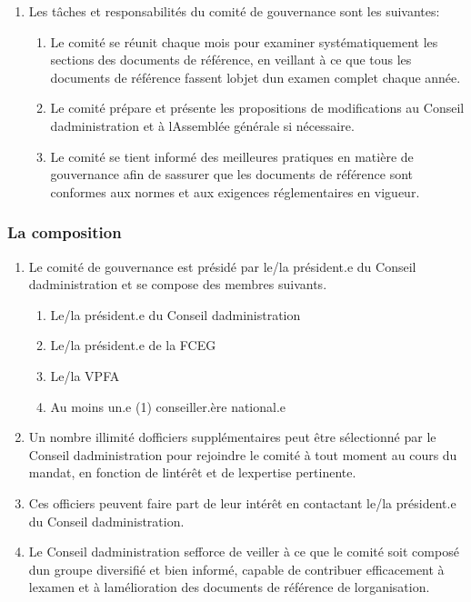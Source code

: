 \begin{enumerate}
 \item
  Les tâches et responsabilités du comité de gouvernance sont les suivantes:

  \begin{enumerate}
   \item
    Le comité se réunit chaque mois pour examiner systématiquement les sections des documents de référence, en veillant à ce que tous les documents de référence fassent l\textquotesingle objet d\textquotesingle un examen complet chaque année.
   \item
    Le comité prépare et présente les propositions de modifications au Conseil d\textquotesingle administration et à l\textquotesingle Assemblée générale si nécessaire.
   \item
    Le comité se tient informé des meilleures pratiques en matière de gouvernance afin de s\textquotesingle assurer que les documents de référence sont conformes aux normes et aux exigences réglementaires en vigueur.
  \end{enumerate}
\end{enumerate}

\subsubsection{La composition}
\label{la-composition}

\begin{enumerate}
 \item
  Le comité de gouvernance est présidé par le/la président.e du Conseil d\textquotesingle administration et se compose des membres suivants.

  \begin{enumerate}
   \item
    Le/la président.e du Conseil d\textquotesingle administration
   \item
    Le/la président.e de la FCEG
   \item
    Le/la VPFA
   \item
    Au moins un.e (1) conseiller.ère national.e
  \end{enumerate}
 \item
  Un nombre illimité d\textquotesingle officiers supplémentaires peut être sélectionné par le Conseil d\textquotesingle administration pour rejoindre le comité à tout moment au cours du mandat, en fonction de l\textquotesingle intérêt et de l\textquotesingle expertise pertinente.
 \item
  Ces officiers peuvent faire part de leur intérêt en contactant le/la président.e du Conseil d\textquotesingle administration.
 \item
  Le Conseil d\textquotesingle administration s\textquotesingle efforce de veiller à ce que le comité soit composé d\textquotesingle un groupe diversifié et bien informé, capable de contribuer efficacement à l\textquotesingle examen et à l\textquotesingle amélioration des documents de référence de l\textquotesingle organisation.
\end{enumerate}


